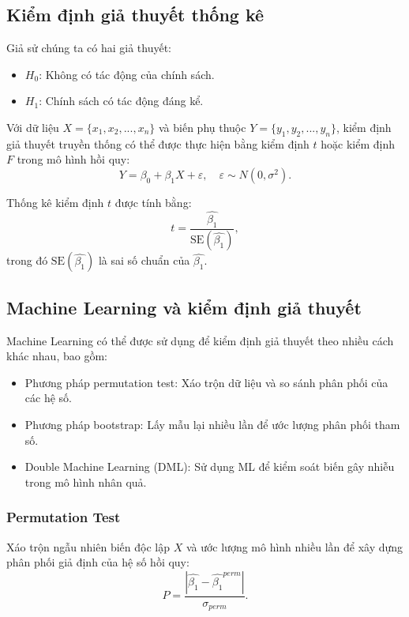 \subsection{Kiểm định giả thuyết thống kê}
Giả sử chúng ta có hai giả thuyết:
\begin{itemize}
    \item $H_0$: Không có tác động của chính sách.
    \item $H_1$: Chính sách có tác động đáng kể.
\end{itemize}

Với dữ liệu $X = \{x_1, x_2, ..., x_n\}$ và biến phụ thuộc $Y = \{y_1, y_2, ..., y_n\}$, kiểm định giả thuyết truyền thống có thể được thực hiện bằng kiểm định $t$ hoặc kiểm định $F$ trong mô hình hồi quy:
\begin{equation}
    Y = \beta_0 + \beta_1 X + \varepsilon, \quad \varepsilon \sim N(0, \sigma^2).
\end{equation}

Thống kê kiểm định $t$ được tính bằng:
\begin{equation}
    t = \frac{\hat{\beta_1}}{\text{SE}(\hat{\beta_1})},
\end{equation}
trong đó $\text{SE}(\hat{\beta_1})$ là sai số chuẩn của $\hat{\beta_1}$.

\subsection{Machine Learning và kiểm định giả thuyết}
Machine Learning có thể được sử dụng để kiểm định giả thuyết theo nhiều cách khác nhau, bao gồm:
\begin{itemize}
    \item Phương pháp permutation test: Xáo trộn dữ liệu và so sánh phân phối của các hệ số.
    \item Phương pháp bootstrap: Lấy mẫu lại nhiều lần để ước lượng phân phối tham số.
    \item Double Machine Learning (DML): Sử dụng ML để kiểm soát biến gây nhiễu trong mô hình nhân quả.
\end{itemize}

\subsubsection{Permutation Test}
Xáo trộn ngẫu nhiên biến độc lập $X$ và ước lượng mô hình nhiều lần để xây dựng phân phối giả định của hệ số hồi quy:
\begin{equation}
    P = \frac{|\hat{\beta_1} - \hat{\beta_1}^{perm}|}{\sigma_{perm}}.
\end{equation}

